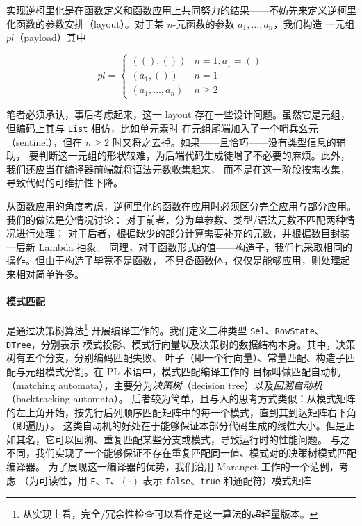 \documentclass[a4paper, 11pt]{article}
\theoremstyle{remark}\newtheorem*{remark}{Remark}
\theoremstyle{definition}\newtheorem*{definition}{Definition}
\begin{document}
实现逆柯里化是在函数定义和函数应用上共同努力的结果——不妨先来定义逆柯里化函数的参数安排（layout）。对于某 $n$-元函数的参数 $a_1,\dots,a_n$，我们构造
一元组 $pl$（payload）其中

\[
  pl =
  \begin{cases}
    ((), ()) & n = 1, a_1 = ()\\
    (a_1, ()) & n = 1\\
    (a_1,\dots,a_n) & n \ge 2
  \end{cases}
\]

笔者必须承认，事后考虑起来，这一 layout 存在一些设计问题。虽然它是元组，但编码上其与 \texttt{List} 相仿，比如单元素时
在元组尾端加入了一个哨兵幺元（sentinel），但在 $n\ge 2$ 时又将之去掉。如果——且恰巧——没有类型信息的辅助，
要判断这一元组的形状较难，为后端代码生成徒增了不必要的麻烦。此外，我们还应当在编译器前端就将语法元数收集起来，
而不是在这一阶段按需收集，导致代码的可维护性下降。

从函数应用的角度考虑，逆柯里化的函数在应用时必须区分完全应用与部分应用。我们的做法是分情况讨论：
对于前者，分为单参数、类型/语法元数不匹配两种情况进行处理；
对于后者，根据缺少的部分计算需要补充的元数，并根据数目封装一层新 Lambda 抽象。
同理，对于函数形式的值——构造子，我们也采取相同的操作。但由于构造子毕竟不是函数，
不具备函数体，仅仅是能够应用，则处理起来相对简单许多。

\paragraph{模式匹配} 是通过决策树算法\footnote{
  从实现上看，完全/冗余性检查可以看作是这一算法的超轻量版本。
}
开展编译工作的。我们定义三种类型 \texttt{Sel}、\texttt{RowState}、\texttt{DTree}，分别表示
模式投影、模式行向量以及决策树的数据结构本身。其中，决策树有五个分支，分别编码匹配失败、
叶子（即一个行向量）、常量匹配、构造子匹配与元组模式分割。在 PL 术语中，模式匹配编译工作的
目标叫做匹配自动机（matching automata），主要分为\emph{决策树}（decision tree）以及\emph{回溯自动机}（backtracking automata）。
后者较为简单，且与人的思考方式类似：从模式矩阵的左上角开始，按先行后列顺序匹配矩阵中的每一个模式，直到其到达矩阵右下角（即遍历）。
这类自动机的好处在于能够保证本部分代码生成的线性大小。但是正如其名，它可以回溯、重复匹配某些分支或模式，导致运行时的性能问题。
与之不同，我们实现了一个能够保证不存在重复匹配同一值、模式对的决策树模式匹配编译器。
为了展现这一编译器的优势，我们沿用 Maranget 工作的一个范例，考虑
（为可读性，用 \texttt{F}、\texttt{T}、$(\cdot)$ 表示 \texttt{false}、\texttt{true} 和通配符）模式矩阵
\end{document}
